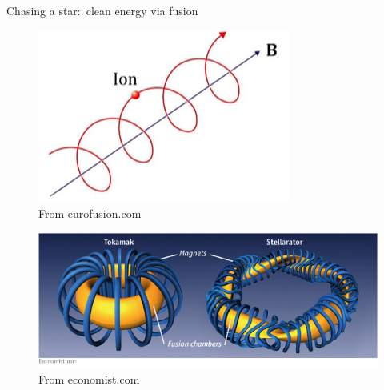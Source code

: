 \documentclass[12pt,table]{beamer}
\begin{document}
\begin{frame}{Chasing a star:~clean energy via fusion}
\begin{minipage}{.3\linewidth}
\begin{figure}
        \includegraphics[width=\linewidth]{figs/cyclotron_motion.png} \\
        \tiny From eurofusion.com
    \end{figure}
    \end{minipage}
    \hfill
    \begin{minipage}{.65\linewidth}
    \begin{figure}
        \centering
        \includegraphics[width=.9\linewidth,clip, trim = .5cm .5cm .5cm 0cm]{figs/tok-stell.png} \\
        \tiny From economist.com
        \label{fig:my_label}
    \end{figure}
    \end{minipage}
\end{frame}
\end{document}
